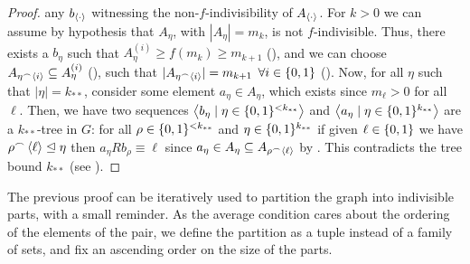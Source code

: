 \begin{lemma}
\begin{proof}
                any $b_{\left< \cdot \right>}$ witnessing the non-$f$-indivisibility of $A_{\left< \cdot \right>}$.
                For $k > 0$ we can assume by hypothesis that $A_\eta$, with $|A_\eta| = m_{k}$, is not $f$-indivisible.
                Thus, there exists a $b_\eta$ such that $A_\eta^{(i)} \geq f(m_{k}) \geq m_{k+1}$ (), and we can choose
                $A_{\eta^\frown \left< i \right>} \subseteq A_\eta^{(i)}$ (), such that
                $|A_{\eta^\frown \left< i \right>}| = m_{k+1}$ $\forall i \in \{ 0,1 \}$ ().
                Now, for all $\eta$ such that $|\eta| = k_{**}$, consider some element $a_\eta \in A_\eta$, which exists since $m_\ell > 0$
                for all $\ell$.
                Then, we have two sequences $\left< b_\eta \mid \eta \in \{ 0,1 \}^{<k_{**}} \right>$ and $\left< a_\eta \mid \eta \in \{ 0,1 \}^{k_{**}} \right>$
                are a $k_{**}$-tree in $G$: for all $\rho \in \{ 0,1 \}^{<k_{**}}$ and $\eta \in \{ 0,1 \}^{k_{**}}$
                if given $\ell \in \{ 0, 1 \}$ we have $\rho^\frown \left< \ell \right> \trianglelefteq \eta$ then
                $a_\eta R b_\rho \equiv \ell$ since $a_\eta \in A_\eta \subseteq A_{\rho ^\frown \left< \ell \right>}$ by .
                This contradicts the tree bound $k_{**}$ (see ).
            \end{proof}
        \end{lemma}

        The previous proof can be iteratively used to partition the graph into indivisible parts, with a small reminder.
        As the average condition cares about the ordering of the elements of the pair, we define the partition as a tuple
        instead of a family of sets, and fix an ascending order on the size of the parts.

